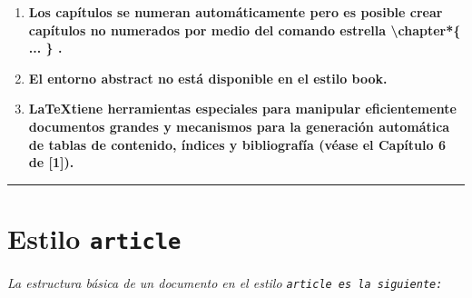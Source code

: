 \documentclass[12pt]{book}
\begin{document}
\newpage {}

\begin{enumerate}
    \item[\HandCuffRight] {\bf Los capítulos se numeran automáticamente pero es posible
    crear capítulos no numerados por medio del comando estrella
    \textbackslash chapter*\{ ... \} .}
    \item[\HandCuffRight] {\bf El entorno abstract no está disponible en el estilo book.}
    \item[\HandCuffRight] {\bf \LaTeX tiene herramientas especiales para manipular eficientemente 
    documentos grandes y mecanismos para la generación automática de tablas de contenido, índices 
    y bibliografía (véase el Capítulo 6 de [1]).}
\end{enumerate}
\begin{center}
    \rule{15cm}{2pt}\par 
\end{center}

\section{\bf Estilo \tt article}
{\em La estructura básica de un documento en el estilo {\tt article es la siguiente:} }

\begin{center}
\end{center}
\end{document}
